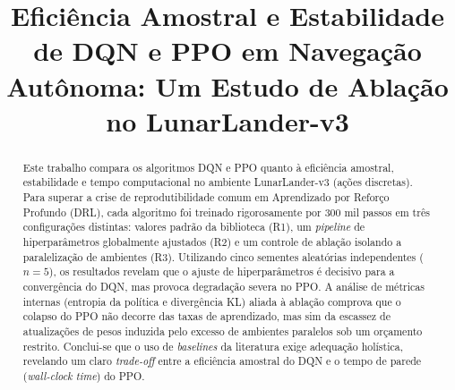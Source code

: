 \documentclass[conference]{IEEEtran}
\begin{document}
\title{Eficiência Amostral e Estabilidade de DQN e PPO em Navegação Autônoma: Um Estudo de Ablação no LunarLander-v3}

\author{
\and
{}
}

\maketitle

\begin{abstract}
Este trabalho compara os algoritmos DQN e PPO quanto à eficiência amostral, estabilidade e tempo computacional no ambiente LunarLander-v3 (ações discretas). Para superar a crise de reprodutibilidade comum em Aprendizado por Reforço Profundo (DRL), cada algoritmo foi treinado rigorosamente por 300 mil passos em três configurações distintas: valores padrão da biblioteca (R1), um \textit{pipeline} de hiperparâmetros globalmente ajustados (R2) e um controle de ablação isolando a paralelização de ambientes (R3). Utilizando cinco sementes aleatórias independentes ($n=5$), os resultados revelam que o ajuste de hiperparâmetros é decisivo para a convergência do DQN, mas provoca degradação severa no PPO. A análise de métricas internas (entropia da política e divergência KL) aliada à ablação comprova que o colapso do PPO não decorre das taxas de aprendizado, mas sim da escassez de atualizações de pesos induzida pelo excesso de ambientes paralelos sob um orçamento restrito. Conclui-se que o uso de \textit{baselines} da literatura exige adequação holística, revelando um claro \textit{trade-off} entre a eficiência amostral do DQN e o tempo de parede (\textit{wall-clock time}) do PPO.
\end{abstract}
\end{document}
